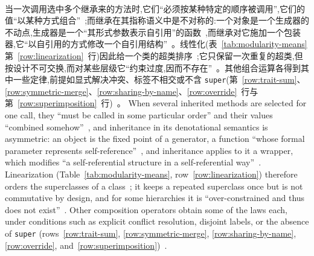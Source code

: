 \begin{CJK*}{UTF8}{gbsn}
\paragraph{}
\ifPaperChinese
当一次调用选中多个继承来的方法时,它们``必须按某种特定的顺序被调用'',它们的值``以某种方式组合''~\cite{moon1986-flavors};而继承在其指称语义中是不对称的:一个对象是一个生成器的不动点,生成器是一个``其形式参数表示自引用''的函数~\cite[第~11~页]{cook1989-denotational-inheritance},而继承对它施加一个包装器,它``以自引用的方式修改一个自引用结构''~\cite[第~15~页]{cook1989-denotational-inheritance}。线性化(表~\ref{tab:modularity-means} 第~\ref{row:linearization}~行)因此给一个类的超类排序~\cite{moon1986-flavors, barrett1996-c3-linearization, simionato2003-python-mro, odersky2005-scalable-components};它只保留一次重复的超类,但按设计不可交换,而对某些层级它``约束过度,因而不存在''~\cite[第~70~页]{barrett1996-c3-linearization}。其他组合运算各得到其中一些定律,前提如显式解决冲突、标签不相交或不含 \texttt{super}(第~\ref{row:trait-sum}、\ref{row:symmetric-merge}、\ref{row:sharing-by-name}、\ref{row:override}~行与第~\ref{row:superimposition}~行)~\cite{scharli2003-traits, ducasse2006-traits-fine-grained-reuse, harper1991-symmetric-record-concatenation, meyer1997-object-oriented-software-construction, cunningham2014-jsonnet, bracha1992-jigsaw-mixins, apel2008-feature-algebra}。
\else
When several inherited methods are selected for one call, they ``must be called in some particular
order'' and their values ``combined somehow''~\cite{moon1986-flavors}, and inheritance in its
denotational semantics is asymmetric: an object is the fixed point of a generator, a function ``whose
formal parameter represents self-reference''~\cite[p.~11]{cook1989-denotational-inheritance}, and
inheritance applies to it a wrapper, which modifies ``a self-referential structure in a self-referential
way''~\cite[p.~15]{cook1989-denotational-inheritance}.
Linearization (Table~\ref{tab:modularity-means}, row~\ref{row:linearization}) therefore orders the
superclasses of a class~\cite{moon1986-flavors, barrett1996-c3-linearization,
simionato2003-python-mro, odersky2005-scalable-components}; it keeps a repeated superclass once but is
not commutative by design, and for some hierarchies it is ``over-constrained and thus does not
exist''~\cite[p.~70]{barrett1996-c3-linearization}.
Other composition operators obtain some of the laws each, under conditions such as explicit conflict
resolution, disjoint labels, or the absence of \texttt{super} (rows~\ref{row:trait-sum}, \ref{row:symmetric-merge}, \ref{row:sharing-by-name},
\ref{row:override}, and~\ref{row:superimposition})~\cite{scharli2003-traits,
ducasse2006-traits-fine-grained-reuse, harper1991-symmetric-record-concatenation,
meyer1997-object-oriented-software-construction, cunningham2014-jsonnet, bracha1992-jigsaw-mixins,
apel2008-feature-algebra}.
\fi



\end{CJK*}
